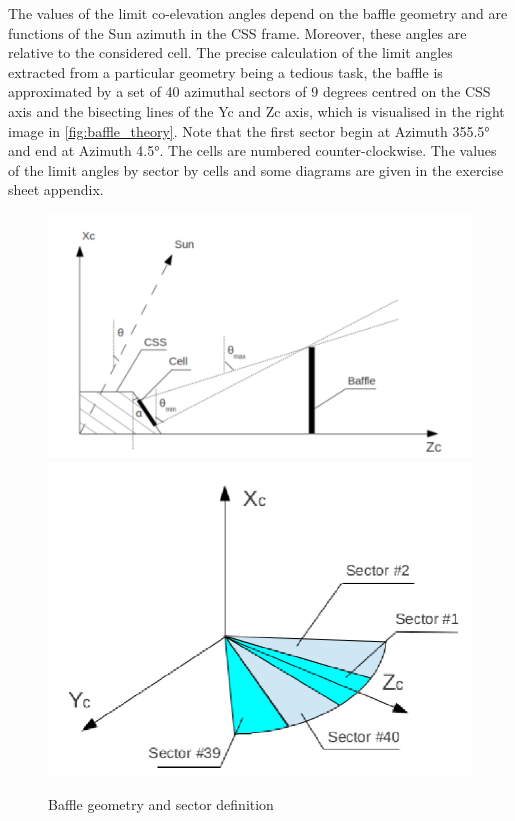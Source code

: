 \vspace{0.5cm}
The values of the limit co-elevation angles depend on the baffle geometry and are functions of the Sun azimuth in the CSS frame. 
Moreover, these angles are relative to the considered cell. The precise calculation of the limit angles extracted from a particular geometry being a tedious task, the baffle is approximated by a set of 40 azimuthal sectors of 9 degrees centred on the CSS axis and the bisecting lines of the Yc and Zc axis, which is visualised in the right image in \autoref{fig:baffle_theory}.
Note that the first sector begin at Azimuth 355.5° and end at Azimuth 4.5°. 
The cells are numbered counter-clockwise. 
The values of the limit angles by sector by cells and some diagrams are given in the exercise sheet appendix.



\begin{figure}[H]
    \centering
    \includegraphics[width=0.45\linewidth]{doc//Graphics/baffle_geometry.png}
    \hfill
    \includegraphics[width=0.45\linewidth]{doc//Graphics/baffle_sectors.png}
    \caption{Baffle geometry and sector definition}
    \label{fig:baffle_theory}
\end{figure}


